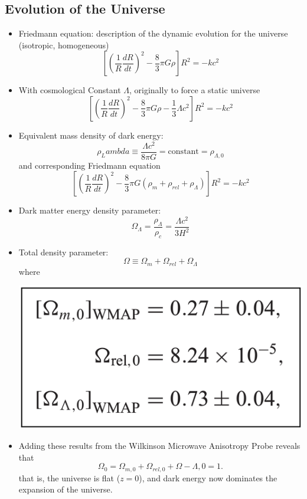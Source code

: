\documentclass{book}
\begin{document}
\subsection{Evolution of the Universe}
\begin{itemize}
    \item Friedmann equation: description of the dynamic evolution for the universe (isotropic, homogeneous)
          \begin{equation*}
              \left[  \left( \frac{1}{R} \frac{dR}{dt} \right)^2 - \frac{8}{3} \pi G \rho \right] R^2 = - k c^2 \tag{C\&O 29.107}
          \end{equation*}
    \item With cosmological Constant $\Lambda$, originally to force a static universe
          \begin{equation*}
              \left[  \left( \frac{1}{R} \frac{dR}{dt} \right)^2 - \frac{8}{3} \pi G \rho - \frac{1}{3} \Lambda c^2 \right] R^2 = - k c^2 \tag{C\&O 29.108}
          \end{equation*}
    \item Equivalent mass density of dark energy:
          \begin{equation*}
              \rho_Lambda \equiv \frac{\Lambda c^2}{8 \pi G} = \text{constant} = \rho_{\Lambda, 0} \tag{C\&O 29.113}
          \end{equation*}
          and corresponding Friedmann equation
          \begin{equation*}
              \left[  \left( \frac{1}{R} \frac{dR}{dt} \right)^2 - \frac{8}{3} \pi G (\rho_m + \rho_{rel} + \rho_\Lambda) \right] R^2 = - k c^2 \tag{C\&O 29.114}
          \end{equation*}
    \item Dark matter energy density parameter:
          \begin{equation*}
              \Omega_\Lambda = \frac{\rho_\Lambda}{\rho_c} = \frac{\Lambda c^2}{3 H^2} \tag{C\&O 29.118}
          \end{equation*}
    \item Total density parameter:
          \begin{equation*}
              \Omega \equiv \Omega_m + \Omega_{rel} + \Omega_\Lambda
          \end{equation*}
          where
          \begin{center}
              \includegraphics[height = 0.15 \textwidth]{images/total_density.png}
          \end{center}
    \item Adding these results from the Wilkinson Microwave Anisotropy Probe reveals that $$\Omega_0 = \Omega_{m,0} + \Omega_{rel,0} + \Omega-{\Lambda,0} = 1.$$ that is, the universe is flat ($z = 0$), and dark energy now dominates the expansion of the universe.
\end{itemize}
\end{document}
